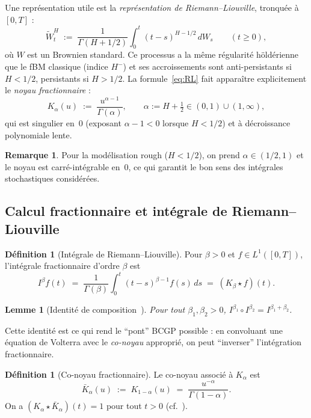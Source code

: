 \documentclass[11pt,a4paper]{article}
\newtheorem{lemma}[theorem]{Lemme}
\theoremstyle{definition}
\newtheorem{definition}[theorem]{Définition}
\newtheorem{remark}[theorem]{Remarque}
\newcommand{\1}{\mathbf{1}}
\begin{document}
Une représentation utile est la \emph{représentation de Riemann--Liouville},
tronquée à $[0,T]$ :
\begin{equation}
\widetilde W^H_t \;:=\; \frac{1}{\Gamma(H+1/2)}\int_0^t (t-s)^{H-1/2}\, dW_s
\qquad(t\geq 0),
\label{eq:RL}
\end{equation}
où $W$ est un Brownien standard. Ce processus a la même régularité höldérienne
que le fBM classique (indice $H^{-}$) et ses accroissements sont
anti-persistants si $H<1/2$, persistants si $H>1/2$. La formule~\eqref{eq:RL}
fait apparaître explicitement le \emph{noyau fractionnaire} :
\begin{equation}
K_\alpha(u) \;:=\; \frac{u^{\alpha-1}}{\Gamma(\alpha)},
\qquad \alpha := H + \tfrac{1}{2} \in (0,1)\cup(1,\infty),
\label{eq:Kalpha}
\end{equation}
qui est singulier en~$0$ (exposant $\alpha-1<0$ lorsque $H<1/2$) et à
décroissance polynomiale lente.

\begin{remark}
Pour la modélisation rough ($H<1/2$), on prend $\alpha\in(1/2,1)$ et le noyau est
carré-intégrable en~$0$, ce qui garantit le bon sens des intégrales stochastiques
considérées.
\end{remark}

\subsection{Calcul fractionnaire et intégrale de Riemann--Liouville}

\begin{definition}[Intégrale de Riemann--Liouville]
Pour $\beta>0$ et $f\in L^1([0,T])$, l'intégrale fractionnaire d'ordre $\beta$ est
\[
I^\beta f(t) \;=\; \frac{1}{\Gamma(\beta)} \int_0^t (t-s)^{\beta-1} f(s)\, ds
\;=\; (K_\beta \star f)(t).
\]
\end{definition}

\begin{lemma}[Identité de composition~\cite{SKM93}]
Pour tout $\beta_1,\beta_2>0$, $I^{\beta_1}\circ I^{\beta_2} = I^{\beta_1+\beta_2}$.
\end{lemma}

Cette identité est ce qui rend le \enquote{pont} BCGP possible : en convoluant une
équation de Volterra avec le \emph{co-noyau} approprié, on peut \enquote{inverser}
l'intégration fractionnaire.

\begin{definition}[Co-noyau fractionnaire]
Le co-noyau associé à $K_\alpha$ est
\[
\bar K_\alpha(u) \;:=\; K_{1-\alpha}(u) \;=\; \frac{u^{-\alpha}}{\Gamma(1-\alpha)}.
\]
On a $(K_\alpha\star\bar K_\alpha)(t) = 1$ pour tout $t>0$
(cf.~\cite[Ex.~A.8]{BCGP23}).
\end{definition}
\end{document}
